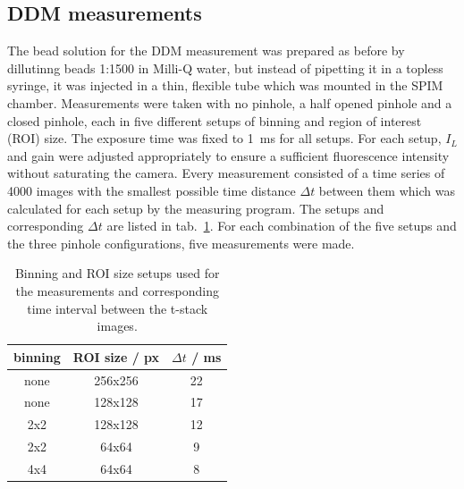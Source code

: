 \subsection*{DDM measurements}
The bead solution for the DDM measurement was prepared as before by dillutinng beads 1:1500 in Milli-Q water, but instead of pipetting it in a topless syringe, it was injected in a thin, flexible tube which was mounted in the SPIM chamber. Measurements were taken with no pinhole, a half opened pinhole and a closed pinhole, each in five different setups of binning and region of interest (ROI) size. The exposure time was fixed to \SI{1}{\milli\second} for all setups. For each setup, $I_L$ and gain were adjusted appropriately to ensure a sufficient fluorescence intensity without saturating the camera. Every measurement consisted of a time series of \num{4000} images with the smallest possible time distance $\Delta t$ between them which was calculated for each setup by the measuring program. The setups and corresponding $\Delta t$ are listed in tab.~\ref{tab:setups}. For each combination of the five setups and the three pinhole configurations, five measurements were made. 

\begin{table}
    \centering
    \begin{tabular}{c c c}
        \toprule
        binning & ROI size / px & $\Delta t$ / \si{\milli\second} \\
        \midrule
        none & 256x256 & 22 \\
        none & 128x128 & 17 \\
        2x2 & 128x128 & 12 \\
        2x2 & 64x64 & 9 \\
        4x4 & 64x64 & 8 \\
        \bottomrule
    \end{tabular}
    \caption{Binning and ROI size setups used for the measurements and corresponding time interval between the t-stack images.}
    \label{tab:setups}
\end{table}